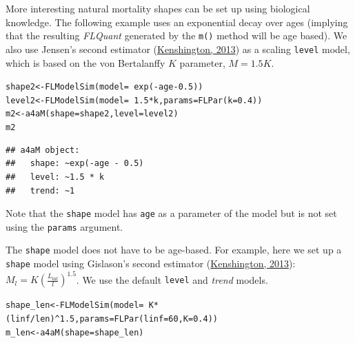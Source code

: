 \documentclass[a4paper,english,10pt]{article}\usepackage[]{graphicx}\usepackage[]{color}
\makeatletter
\newcommand{\hlnum}[1]{\textcolor[rgb]{0.2,0.2,0.2}{#1}}%
\newcommand{\hlopt}[1]{\textcolor[rgb]{0.2,0.2,0.2}{#1}}%
\newcommand{\hlstd}[1]{\textcolor[rgb]{0,0,0}{#1}}%
\newcommand{\hlkwb}[1]{\textcolor[rgb]{0.361,0.506,0.596}{#1}}%
\newcommand{\hlkwc}[1]{\textcolor[rgb]{0.361,0.506,0.596}{#1}}%
\newcommand{\hlkwd}[1]{\textcolor[rgb]{0.361,0.506,0.596}{#1}}%
\newenvironment{kframe}{%
 \def\at@end@of@kframe{}%
 \ifinner\ifhmode%
  \def\at@end@of@kframe{\end{minipage}}%
  \begin{minipage}{\columnwidth}%
 \fi\fi%
 \def\FrameCommand##1{\hskip\@totalleftmargin \hskip-\fboxsep
 \colorbox{shadecolor}{##1}\hskip-\fboxsep
     \hskip-\linewidth \hskip-\@totalleftmargin \hskip\columnwidth}%
 \MakeFramed {\advance\hsize-\width
   \@totalleftmargin\z@ \linewidth\hsize
   \@setminipage}}%
 {\par\unskip\endMakeFramed%
 \at@end@of@kframe}
\newenvironment{knitrout}{}{} %
\newcommand{\code}[1]{{\texttt{#1}}}
\newcommand{\class}[1]{{\textit{#1}}}
\makeatother
\begin{document}
More interesting natural mortality shapes can be set up using biological knowledge. The following example uses an exponential decay over ages (implying that the resulting \class{FLQuant} generated by the \code{m()} method will be age based). We also use Jensen's second estimator (\href{}{Kenshington, 2013}) as a scaling \code{level} model, which is based on the von Bertalanffy $K$ parameter, $M=1.5K$. 

\begin{knitrout}
\color{fgcolor}\begin{kframe}
\begin{alltt}
\hlstd{shape2} \hlkwb{<-} \hlkwd{FLModelSim}\hlstd{(}\hlkwc{model}\hlstd{=}\hlopt{~}\hlkwd{exp}\hlstd{(}\hlopt{-}\hlstd{age}\hlopt{-}\hlnum{0.5}\hlstd{))}
\hlstd{level2} \hlkwb{<-} \hlkwd{FLModelSim}\hlstd{(}\hlkwc{model}\hlstd{=}\hlopt{~}\hlnum{1.5}\hlopt{*}\hlstd{k,} \hlkwc{params}\hlstd{=}\hlkwd{FLPar}\hlstd{(}\hlkwc{k}\hlstd{=}\hlnum{0.4}\hlstd{))}
\hlstd{m2} \hlkwb{<-} \hlkwd{a4aM}\hlstd{(}\hlkwc{shape}\hlstd{=shape2,} \hlkwc{level}\hlstd{=level2)}
\hlstd{m2}
\end{alltt}
\begin{verbatim}
## a4aM object:
##   shape: ~exp(-age - 0.5)
##   level: ~1.5 * k
##   trend: ~1
\end{verbatim}
\end{kframe}
\end{knitrout}

Note that the \code{shape} model has \code{age} as a parameter of the model but is not set using the \code{params} argument.

The \code{shape} model does not have to be age-based. For example, here we set up a \code{shape} model using Gislason's second estimator (\href{}{Kenshington, 2013}):
$M_l=K(\frac{L_{\inf}}{l})^{1.5}$. We use the default \code{level} and \class{trend} models.

\begin{knitrout}
\color{fgcolor}\begin{kframe}
\begin{alltt}
\hlstd{shape_len} \hlkwb{<-} \hlkwd{FLModelSim}\hlstd{(}\hlkwc{model}\hlstd{=}\hlopt{~}\hlstd{K}\hlopt{*}\hlstd{(linf}\hlopt{/}\hlstd{len)}\hlopt{^}\hlnum{1.5}\hlstd{,} \hlkwc{params}\hlstd{=}\hlkwd{FLPar}\hlstd{(}\hlkwc{linf}\hlstd{=}\hlnum{60}\hlstd{,} \hlkwc{K}\hlstd{=}\hlnum{0.4}\hlstd{))}
\hlstd{m_len} \hlkwb{<-} \hlkwd{a4aM}\hlstd{(}\hlkwc{shape}\hlstd{=shape_len)}
\end{alltt}
\end{kframe}
\end{knitrout}
\end{document}
